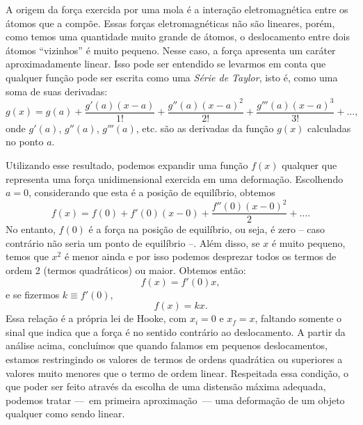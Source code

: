 A origem da força exercida por uma mola é a interação eletromagnética entre os átomos que a compõe. Essas forças eletromagnéticas não são lineares, porém, como temos uma quantidade muito grande de átomos, o deslocamento entre dois átomos ``vizinhos'' é muito pequeno. Nesse caso, a força apresenta um caráter aproximadamente linear. Isso pode ser entendido se levarmos em conta que qualquer função pode ser escrita como uma \emph{Série de Taylor}, isto é, como uma soma de suas derivadas:
\begin{equation}
	g(x) = g(a) + \frac{g'(a)(x - a)}{1!} + \frac{g''(a)(x-a)^2}{2!} + \frac{g'''(a)(x-a)^3}{3!} + \dots,
\end{equation}
onde $g'(a)$, $g''(a)$, $g'''(a)$, etc. são as derivadas da função $g(x)$ calculadas no ponto $a$.

Utilizando esse resultado, podemos expandir uma função $f(x)$ qualquer que representa uma força unidimensional exercida em uma deformação. Escolhendo $a=0$, considerando que esta é a posição de equilíbrio, obtemos
\begin{equation}
	f(x) = f(0) + f'(0) (x-0) + \frac{f''(0)(x-0)^2}{2} + \dots.
\end{equation}
%
No entanto, $f(0)$ é a força na posição de equilíbrio, ou seja, é zero -- caso contrário não seria um ponto de equilíbrio --. Além disso, se $x$ é muito pequeno, temos que $x^2$ é menor ainda e por isso podemos desprezar todos os termos de ordem 2 (termos quadráticos) ou maior. Obtemos então:
\begin{equation}
	f(x) = f'(0)x,
\end{equation}
%
e se fizermos $k \equiv f'(0)$,
\begin{equation}
	f(x) = kx.
\end{equation}
%
Essa relação é a própria lei de Hooke, com $x_i = 0$ e $x_f = x$, faltando somente o sinal que indica que a força é no sentido contrário ao deslocamento. A partir da análise acima, concluímos que quando falamos em pequenos deslocamentos, estamos restringindo os valores de termos de ordens quadrática ou superiores a valores muito menores que o termo de ordem linear. Respeitada essa condição, o que poder ser feito através da escolha de uma distensão máxima adequada, podemos tratar ---~em primeira aproximação~--- uma deformação de um objeto qualquer como sendo linear.


